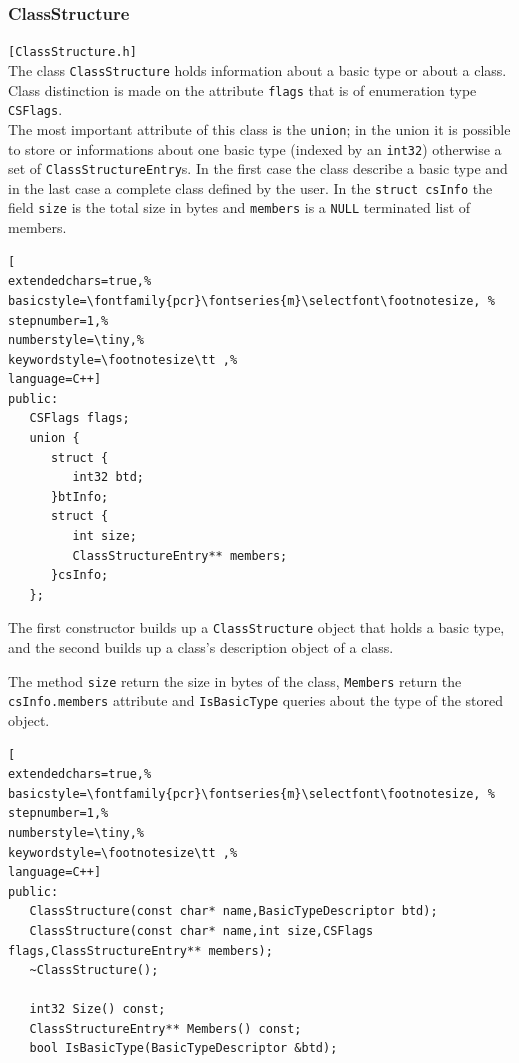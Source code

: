 \subsubsection{ClassStructure}
\texttt{[ClassStructure.h]}\\
The class \texttt{ClassStructure} holds information about a basic type or about a class. Class distinction is made on the attribute \texttt{flags} that is of enumeration type \texttt{CSFlags}. \\


The most important attribute of this class is the \texttt{union}; in the union it is possible to store or informations about one basic type (indexed by an \texttt{int32}) otherwise a set of \texttt{ClassStructureEntry}s. In the first case the class describe a basic type and in the last case a complete class defined by the user. In the \texttt{struct csInfo} the field \texttt{size} is the total size in bytes and \texttt{members} is a \texttt{NULL} terminated list of members.

\begin{lstlisting}[
extendedchars=true,%
basicstyle=\fontfamily{pcr}\fontseries{m}\selectfont\footnotesize, %
stepnumber=1,%
numberstyle=\tiny,%
keywordstyle=\footnotesize\tt ,%
language=C++]
public:
   CSFlags flags;
   union {
      struct {
         int32 btd;
      }btInfo;
      struct {
         int size;
         ClassStructureEntry** members;
      }csInfo;
   };
\end{lstlisting}

The first constructor builds up a \texttt{ClassStructure} object that holds a basic type, and the second builds up a class's description object of a class.

The method \texttt{size} return the size in bytes of the class, \texttt{Members} return the \texttt{csInfo.members} attribute and \texttt{IsBasicType} queries about the type of the stored object.

\begin{lstlisting}[
extendedchars=true,%
basicstyle=\fontfamily{pcr}\fontseries{m}\selectfont\footnotesize, %
stepnumber=1,%
numberstyle=\tiny,%
keywordstyle=\footnotesize\tt ,%
language=C++]
public:
   ClassStructure(const char* name,BasicTypeDescriptor btd);
   ClassStructure(const char* name,int size,CSFlags flags,ClassStructureEntry** members);
   ~ClassStructure();

   int32 Size() const;
   ClassStructureEntry** Members() const;
   bool IsBasicType(BasicTypeDescriptor &btd);
\end{lstlisting}



